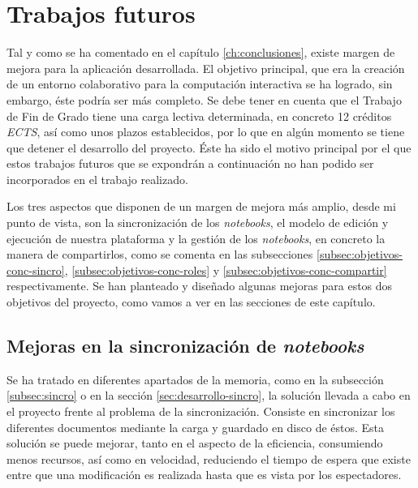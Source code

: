 \documentclass[11pt,spanish,listoffigures]{tfgetsinf}
\begin{document}



\chapter{Trabajos futuros}
\label{ch:futuro}


Tal y como se ha comentado en el capítulo \ref{ch:conclusiones}, existe  margen de mejora para la aplicación desarrollada. El objetivo principal, que era la creación de un entorno colaborativo para la computación interactiva se ha logrado, sin embargo, éste podría ser más completo. Se debe tener en cuenta que el Trabajo de Fin de Grado tiene una carga lectiva determinada, en concreto 12 créditos \textit{ECTS}, así como unos plazos establecidos, por lo que en algún momento se tiene que detener el desarrollo del proyecto. Éste ha sido el motivo principal por el que estos trabajos futuros que se expondrán a continuación no han podido ser incorporados en el trabajo realizado.

Los tres aspectos que disponen de un margen de mejora más amplio, desde mi punto de vista, son la sincronización de los \textit{notebooks}, el modelo de edición y ejecución de nuestra plataforma y la gestión de los \textit{notebooks}, en concreto la manera de compartirlos, como se comenta en las subsecciones \ref{subsec:objetivos-conc-sincro}, \ref{subsec:objetivos-conc-roles} y  \ref{subsec:objetivos-conc-compartir} respectivamente. Se han planteado y diseñado algunas mejoras para estos dos objetivos del proyecto, como vamos a ver en las secciones de este capítulo.



\section{Mejoras en la sincronización de \textit{notebooks}}
\label{sec:mejoras-sincro}

Se ha tratado en diferentes apartados de la memoria, como en la subsección \ref{subsec:sincro} o en la sección \ref{sec:desarrollo-sincro}, la solución llevada a cabo en el proyecto frente al problema de la sincronización. Consiste en sincronizar los diferentes documentos mediante la carga y guardado en disco de éstos. 
Esta solución se puede mejorar, tanto en el aspecto de la eficiencia, consumiendo menos recursos, así como en velocidad, reduciendo el tiempo de espera que existe entre que una modificación es realizada hasta que es vista por los espectadores.
\end{document}

